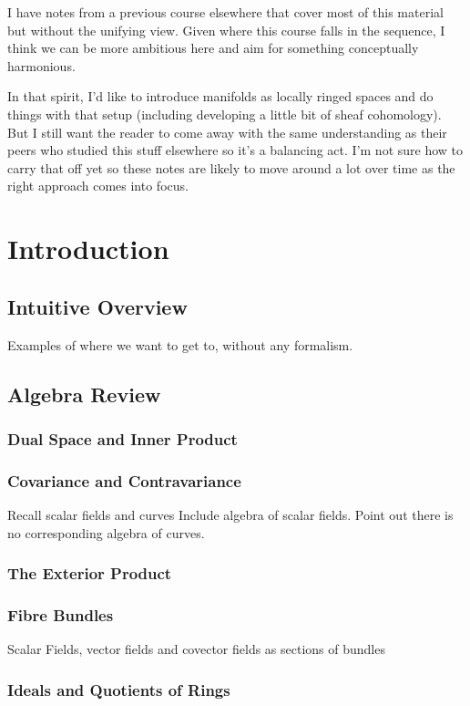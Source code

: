 \documentclass[oneside,english]{amsbook}
\numberwithin{section}{chapter}
\theoremstyle{plain}
\theoremstyle{definition}
\begin{document}
	I have notes from a previous course elsewhere that cover most of this material but without the unifying view. Given where this course falls in the sequence, I think we can be more ambitious here and aim for something conceptually harmonious. 
	
	In that spirit, I'd like to introduce manifolds as locally ringed spaces and do things with that setup (including developing a little bit of sheaf cohomology). But I still want the reader to come away with the same understanding as their peers who studied this stuff elsewhere so it's a balancing act. I'm not sure how to carry that off yet so these notes are likely to move around a lot over time as the right approach comes into focus. 

	\chapter{Introduction}
		\section{Intuitive Overview}
			Examples of where we want to get to, without any formalism.
		\section{Algebra Review}
			\subsection{Dual Space and Inner Product}
			\subsection{Covariance and Contravariance}
			Recall scalar fields and curves
			Include algebra of scalar fields. Point out there is no corresponding algebra of curves. 
			\subsection{The Exterior Product}
			\subsection{Fibre Bundles}
			Scalar Fields, vector fields and covector fields as sections of bundles
			\subsection{Ideals and Quotients of Rings}
\end{document}
